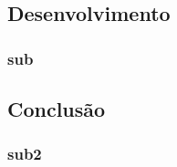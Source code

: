 \documentclass[journal]{IEEEtran}
\begin{document}


\subsection{Desenvolvimento}
\subsubsection{sub}

\subsection{Conclusão}
\subsubsection{sub2}


%
%

\end{document}
